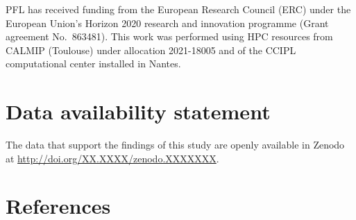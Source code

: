 \documentclass[aip,jcp,reprint,noshowkeys,superscriptaddress]{revtex4-1}
\begin{document}
\begin{acknowledgements}
PFL has received funding from the European Research Council (ERC) under the European Union's Horizon 2020 research and innovation programme (Grant agreement No.~863481).
This work was performed using HPC resources from CALMIP (Toulouse) under allocation 2021-18005 and of the CCIPL computational center installed in Nantes.
\end{acknowledgements}

\section*{Data availability statement}
The data that support the findings of this study are openly available in Zenodo at \href{http://doi.org/XX.XXXX/zenodo.XXXXXXX}{http://doi.org/XX.XXXX/zenodo.XXXXXXX}.

\section*{References}

\end{document}
